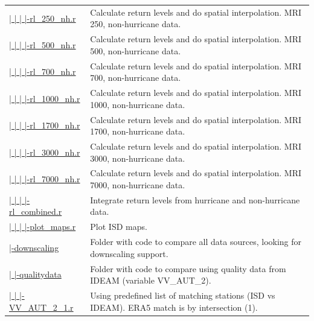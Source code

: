 \documentclass[12pt,oneside]{reedthesis}
\begin{document}
\begin{longtable}[t]{>{\raggedright\arraybackslash}p{1.3in}>{\raggedright\arraybackslash}p{4.9in}}
\href{ftp://ftp.geocorp.co/windthesis/code/pot_pp/isd/maps/return_levels_250_nh.r}{  |    |    |    |-rl\_250\_nh.r} & Calculate return levels and do spatial interpolation. MRI 250, non-hurricane data.\\
\href{ftp://ftp.geocorp.co/windthesis/code/pot_pp/isd/maps/return_levels_500_nh.r}{  |    |    |    |-rl\_500\_nh.r} & Calculate return levels and do spatial interpolation. MRI 500, non-hurricane data.\\
\href{ftp://ftp.geocorp.co/windthesis/code/pot_pp/isd/maps/return_levels_700_nh.r}{  |    |    |    |-rl\_700\_nh.r} & Calculate return levels and do spatial interpolation. MRI 700, non-hurricane data.\\
\href{ftp://ftp.geocorp.co/windthesis/code/pot_pp/isd/maps/return_levels_1000_nh.r}{  |    |    |    |-rl\_1000\_nh.r} & Calculate return levels and do spatial interpolation. MRI 1000, non-hurricane data.\\
\href{ftp://ftp.geocorp.co/windthesis/code/pot_pp/isd/maps/return_levels_1700_nh.r}{  |    |    |    |-rl\_1700\_nh.r} & Calculate return levels and do spatial interpolation. MRI 1700, non-hurricane data.\\
\href{ftp://ftp.geocorp.co/windthesis/code/pot_pp/isd/maps/return_levels_3000_nh.r}{  |    |    |    |-rl\_3000\_nh.r} & Calculate return levels and do spatial interpolation. MRI 3000, non-hurricane data.\\
\href{ftp://ftp.geocorp.co/windthesis/code/pot_pp/isd/maps/return_levels_7000_nh.r}{  |    |    |    |-rl\_7000\_nh.r} & Calculate return levels and do spatial interpolation. MRI 7000, non-hurricane data.\\
\href{ftp://ftp.geocorp.co/windthesis/code/pot_pp/isd/maps/return_levels_combined.r}{  |    |    |    |-rl\_combined.r} & Integrate return levels from hurricane and non-hurricane data.\\
\href{ftp://ftp.geocorp.co/windthesis/code/pot_pp/isd/maps/plot_maps.r}{  |    |    |    |-plot\_maps.r} & Plot ISD maps.\\
\href{ftp://ftp.geocorp.co/windthesis/code/downscaling/}{  |-downscaling} & Folder with code to compare all data sources, looking for downscaling support.\\
\href{ftp://ftp.geocorp.co/windthesis/code/downscaling/qualitydata/}{  |    |-qualitydata} & Folder with code to compare using quality data from IDEAM (variable VV\_AUT\_2).\\
\href{ftp://ftp.geocorp.co/windthesis/code/downscaling/qualitydata/comparing_VV_AUT_2_1.r}{  |    |    |-VV\_AUT\_2\_1.r} & Using predefined list of matching stations (ISD vs IDEAM). ERA5 match is by intersection (1).\\

\end{longtable}
\end{document}
